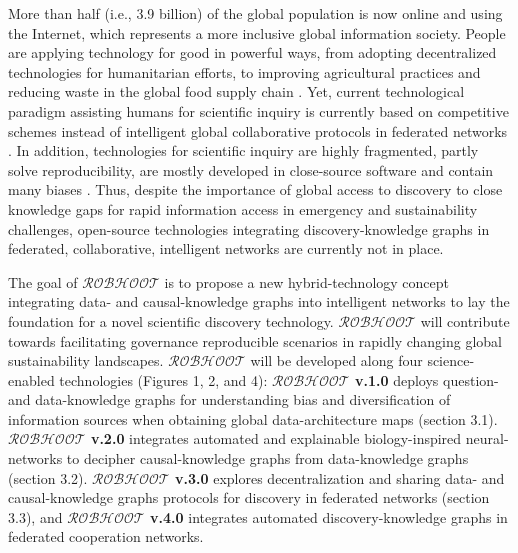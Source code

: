 \documentclass[11pt, a4paper]{article} %
\begin{document}
More than half (i.e., 3.9 billion) of the global population is now
online and using the Internet, which represents a more inclusive
global information society. People are applying technology for good in
powerful ways, from adopting decentralized technologies for
humanitarian efforts, to improving agricultural practices and reducing
waste in the global food supply chain \citep{Wilson2018}. Yet, current
technological paradigm assisting humans for scientific inquiry is
currently based on competitive schemes instead of intelligent global
collaborative protocols in federated networks \citep{Dilley2016}. In
addition, technologies for scientific inquiry are highly fragmented,
partly solve reproducibility, are mostly developed in close-source
software and contain many biases
\citep{Inhaber1977,Ioannidis2005,Fang2011,Gunther2018,Hardwicke2018,Mehrabi2019,Real2020}. Thus,
despite the importance of global access to discovery to close
knowledge gaps for rapid information access in emergency and
sustainability challenges, open-source technologies integrating
discovery-knowledge graphs in federated, collaborative, intelligent
networks are currently not in place.

The goal of $\mathcal{ROBHOOT}$ is to propose a new hybrid-technology
concept integrating data- and causal-knowledge graphs into intelligent
networks to lay the foundation for a novel scientific discovery
technology. $\mathcal{ROBHOOT}$ will contribute towards facilitating
governance reproducible scenarios in rapidly changing global
sustainability landscapes. $\mathcal{ROBHOOT}$ will be developed along
four science-enabled technologies (Figures 1, 2, and 4): {\bf
  $\mathcal{ROBHOOT}$ v.1.0} deploys question- and data-knowledge
graphs for understanding bias and diversification of information
sources when obtaining global data-architecture maps (section
3.1). {\bf $\mathcal{ROBHOOT}$ v.2.0} integrates automated and
explainable biology-inspired neural-networks to decipher
causal-knowledge graphs from data-knowledge graphs (section 3.2). {\bf
  $\mathcal{ROBHOOT}$ v.3.0} explores decentralization and sharing
data- and causal-knowledge graphs protocols for discovery in federated
networks (section 3.3), and {\bf $\mathcal{ROBHOOT}$ v.4.0} integrates
automated discovery-knowledge graphs in federated cooperation
networks.
\end{document}
